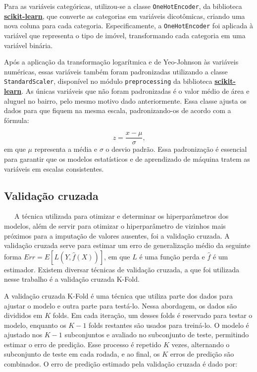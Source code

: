 \documentclass[
  12pt,
  a4paper,
]{scrreprt}
\begin{document}
\vspace{12pt}

Para as variáveis categóricas, utilizou-se a classe
\texttt{OneHotEncoder}, da biblioteca
\href{https://scikit-learn.org/stable/}{\textbf{scikit-learn}}, que
converte as categorias em variáveis dicotômicas, criando uma nova coluna
para cada categoria. Especificamente, a \texttt{OneHotEncoder} foi
aplicada à variável que representa o tipo de imóvel, transformando cada
categoria em uma variável binária.

\vspace{12pt}

Após a aplicação da transformação logarítmica e de Yeo-Johnson às
variáveis numéricas, essas variáveis também foram padronizadas
utilizando a classe \texttt{StandardScaler}, disponível no módulo
\texttt{preprocessing} da biblioteca
\href{https://scikit-learn.org/stable/}{\textbf{scikit-learn}}. As
únicas variáveis que não foram padronizadas é o valor médio de área e
aluguel no bairro, pelo mesmo motivo dado anteriormente. Essa classe
ajusta os dados para que fiquem na mesma escala, padronizando-os de
acordo com a fórmula:

\[
z = \frac{x - \mu}{\sigma}\text{,}
\] em que \(\mu\) representa a média e \(\sigma\) o desvio padrão. Essa
padronização é essencial para garantir que os modelos estatísticos e de
aprendizado de máquina tratem as variáveis em escalas consistentes.

\subsection{Validação cruzada}\label{validauxe7uxe3o-cruzada}

~~~A técnica utilizada para otimizar e determinar os hiperparâmetros dos
modelos, além de servir para otimizar o hiperparâmetro de vizinhos mais
próximos para a imputação de valores ausentes, foi a validação cruzada.
A validação cruzada serve para estimar um erro de generalização médio da
seguinte forma
\(Err = E\left[L\left(Y, \hat{f}\left(X\right)\right)\right]\), em que
\(L\) é uma função perda e \(\hat f\) é um estimador. Existem diversar
técnicas de validação cruzada, a que foi utilizada nesse trabalho é a
validação cruzada K-Fold.

\vspace{12pt}

A validação cruzada K-Fold é uma técnica que utiliza parte dos dados
para ajustar o modelo e outra parte para testá-lo. Nessa abordagem, os
dados são divididos em \(K\) folds. Em cada iteração, um desses folds é
reservado para testar o modelo, enquanto os \(K−1\) folds restantes são
usados para treiná-lo. O modelo é ajustado nos \(K−1\) subconjuntos e
avaliado no subconjunto de teste, permitindo estimar o erro de predição.
Esse processo é repetido \(K\) vezes, alternando o subconjunto de teste
em cada rodada, e ao final, os \(K\) erros de predição são combinados. O
erro de predição estimado pela validação cruzada é dado por:
\end{document}
